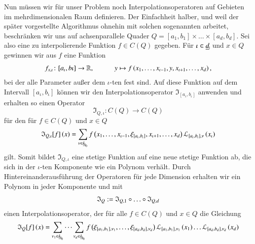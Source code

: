       
      Nun müssen wir für unser Problem noch Interpolationsoperatoren auf Gebieten im mehrdimensionalen Raum definieren. Der Einfachheit halber, und weil der später vorgestellte Algorithmus ohnehin 
      mit solchen sogenannten  arbeitet, beschränken wir uns auf achsenparallele Quader $Q = [a_1,b_1] \times \dots \times [a_d,b_d]$. Sei also eine zu interpolierende Funktion
      $f \in C\left(Q\right)$ gegeben. Für $\iota \in \haken{d}$ und $x \in Q$ gewinnen wir aus $f$ eine Funktion
      \begin{equation*}
	f_{x,\iota} \colon [a_\iota,b\iota] \to \mathbb{R}, \ \ \ \ \ \ \ \ \ \ \ \ y \mapsto f\left(x_1, \dots , x_{\iota-1}, y , x_{\iota+1}, \dots , x_d\right),
      \end{equation*}
      bei der alle Parameter außer dem $\iota$-ten fest sind. Auf diese Funktion auf dem Intervall $[a_\iota,b_\iota]$ können wir den Interpolationsoperator $\mathfrak{I}_{[a_\iota,b_\iota]}$ 
      anwenden und erhalten so einen Operator
      \begin{equation*}
	\mathfrak{I}_{Q,\iota} \colon C\left(Q\right) \to C\left(Q\right)
      \end{equation*}
      für den für $f \in C\left(Q\right)$ und $x \in Q$
      \begin{equation*}
	\mathfrak{I}_{Q,\iota}[f]\left(x\right) = \sum_{\nu \in \nullhaken{k}} f\left(x_1, \dots , x_{\iota-1} , \xi_{[a_\iota,b_\iota]} , x_{\iota+1}, \dots , x_d\right) \lag_{[a_\iota,b_\iota],\nu}\left(x_\iota\right)
      \end{equation*}
      gilt.
      Somit bildet $\mathfrak{I}_{Q,\iota}$ eine stetige Funktion auf eine neue stetige Funktion ab, die sich in der $\iota$-ten Komponente wie ein Polynom verhält. Durch Hintereinanderausführung
      der Operatoren für jede Dimension erhalten wir ein Polynom in jeder Komponente und mit
      \begin{equation*}
	\mathfrak{I}_Q := \mathfrak{I}_{Q,1} \after \dots \after \mathfrak{I}_{Q,d}
      \end{equation*}
      einen Interpolationsoperator, der für alle $f \in C\left(Q\right)$ und $x \in Q$ die Gleichung
      \begin{equation*}
	\mathfrak{I}_Q[f]\left(x\right) = \sum_{\nu_1 \in \nullhaken{k}} \dots \sum_{\nu_d \in \nullhaken{k}} 
			      f \left( \xi_{[a_1,b_1],\nu_1}, \dots , \xi_{[a_d,b_d],\nu_d} \right) 
			      \lag_{[a_1,b_1],\nu_1}\left(x_1\right) \dots  \lag_{[a_d,b_d],\nu_d}\left(x_d\right)
      \end{equation*}
